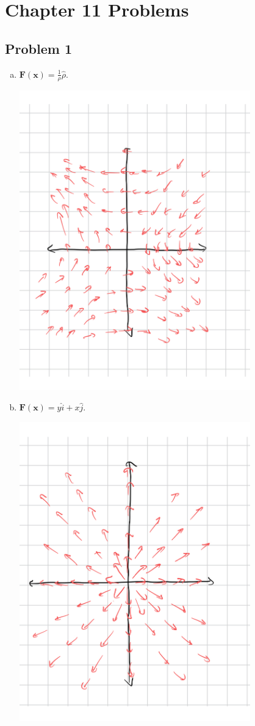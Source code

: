 \documentclass[10pt]{mypackage}
\begin{document}
\RaggedRight
\section{Chapter 11 Problems}%
\subsection{Problem 1}%
\begin{enumerate}[(a)]
  \item $\mathbf{F}\left(\mathbf{x}\right) = \frac{1}{\rho}\hat{\rho}$.
    \begin{center}
      \includegraphics[width=10cm]{images/p_2a_1_11-1a.pdf}
    \end{center}
  \item $\mathbf{F}\left(\mathbf{x}\right) = y\hat{i} + x\hat{j}$.
    \begin{center}
      \includegraphics[width=10cm]{images/p_2a_1_11-1b.pdf}

\end{center}
\end{enumerate}
\end{document}
